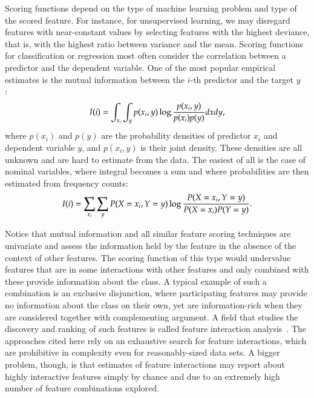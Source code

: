 \begin{refsection}
Scoring functions depend on the type of machine learning problem and type of the scored feature. For instance, for unsupervised learning, we may disregard features with near-constant values by selecting features with the highest deviance, that is, with the highest ratio between variance and the mean. Scoring functions for classification or regression most often consider the correlation between a predictor and the dependent variable. One of the most popular empirical estimates is the mutual information between the $i$-th predictor and the target $y$ ~\citep{Guyon2003} :
$$
I(i)=\int_{x_i}\int_y p(x_i,y)\log{p(x_i,y)\over p(x_i)p(y)}dx dy,
$$
where $p(x_i)$ and $p(y)$ are the probability densities of predictor $x_i$ and dependent variable $y$, and $p(x_i,y)$ is their joint density. These densities are all unknown and are hard to estimate from the data. The easiest of all is the case of nominal variables, where integral becomes a sum and where probabilities are then estimated from frequency counts:
$$
I(i) = \sum_{x_i}\sum_{y} P(X=x_i, Y=y)\log {P(X=x_i,Y=y)\over P(X=x_i) P(Y=y)}.
$$

Notice that mutual information and all similar feature scoring techniques are univariate and assess the information held by the feature in the absence of the context of other features. The scoring function of this type would undervalue features that are in some interactions with other features and only combined with these provide information about the class. A typical example of such a combination is an exclusive disjunction, where participating features may provide no information about the class on their own, yet are information-rich when they are considered together with complementing argument. A field that studies the discovery and ranking of such features is called feature interaction analysis~\citep{Jakulin2005,Anastassiou2007}. The approaches cited here rely on an exhaustive search for feature interactions, which are prohibitive in complexity even for reasonably-sized data sets. A bigger problem, though, is that estimates of feature interactions may report about highly interactive features simply by chance and due to an extremely high number of feature combinations explored.


\end{refsection}
